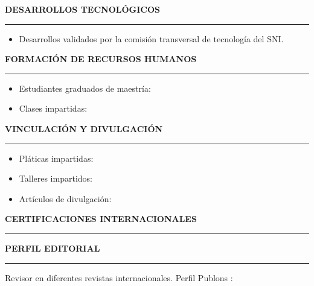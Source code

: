 \documentclass[10pt]{article}
\begin{document}
\vspace{0.3cm}
\textbf{DESARROLLOS TECNOLÓGICOS}
\vspace{3pt}
\hrule
\begin{itemize}
	\item Desarrollos validados por la comisión transversal de tecnología del SNI.
	
\end{itemize}


\vspace{0.3cm}
{\bf FORMACIÓN DE RECURSOS HUMANOS}
\vspace{3pt}
\hrule

\begin{itemize}
	\item Estudiantes graduados de maestría:
	
	
	\item Clases impartidas:
	
\end{itemize}


\vspace{0.3cm}
\textbf{VINCULACIÓN Y DIVULGACIÓN}
\vspace{3pt}
\hrule

\begin{itemize}
	\item Pláticas impartidas:
	
	
	\item Talleres impartidos:
	
	
	\item Artículos de divulgación:
	
\end{itemize}


\vspace{0.3cm}
\textbf{CERTIFICACIONES INTERNACIONALES}
\vspace{3pt}
\hrule


\vspace{0.5cm}
\textbf{PERFIL EDITORIAL}
\vspace{3pt}
\hrule
Revisor en diferentes revistas internacionales. Perfil Publons \href{https://publons.com/author/1349368}{\faExternalLink}: 



%

\end{document}
